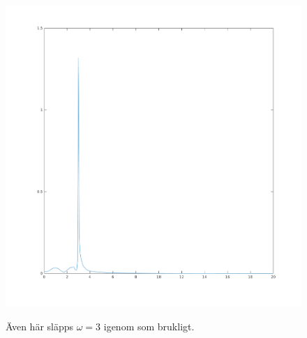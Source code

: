 \begin{figure}
    \caption{Även här släpps $\omega = 3$ igenom som brukligt.}
    \centering
    \includegraphics[scale=0.5]{figures/task4e-fk-y-sys2.png}
    \label{fig:task4e-fk-y-sys2}
\end{figure}



